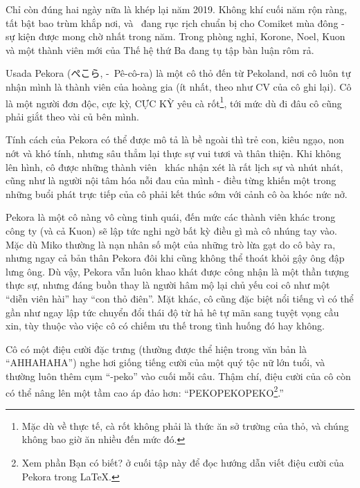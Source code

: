 \documentclass[../main.tex]{subfiles}
\begin{document}

Chỉ còn đúng hai ngày nữa là khép lại năm 2019. Không khí cuối năm rộn ràng, tất bật bao trùm khắp nơi, và \hll\ đang rục rịch chuẩn bị cho Comiket mùa đông - sự kiện được mong chờ nhất trong năm. Trong phòng nghỉ, Korone, Noel, Kuon và một thành viên mới của Thế hệ thứ Ba đang tụ tập bàn luận rôm rả.

\chrint


Usada Pekora (ぺこら, -\ Pê-cô-ra) là một cô thỏ đến từ Pekoland, nơi cô luôn tự nhận mình là thành viên của hoàng gia (ít nhất, theo như CV của cô ghi lại). Cô là một người đơn độc, cực kỳ, CỰC KỲ yêu cà rốt\footnote{Mặc dù về thực tế, cà rốt không phải là thức ăn sở trường của thỏ, và chúng không bao giờ ăn nhiều đến mức đó.}, tới mức dù đi đâu cô cũng phải giắt theo vài củ bên mình.

Tính cách của Pekora có thể được mô tả là bề ngoài thì trẻ con, kiêu ngạo, non nớt và khó tính, nhưng sâu thẳm lại thực sự vui tươi và thân thiện. Khi không lên hình, cô được những thành viên \hll\ khác nhận xét là rất lịch sự và nhút nhát, cũng như là người nội tâm hóa nỗi đau của mình - điều từng khiến một trong những buổi phát trực tiếp của cô phải kết thúc sớm với cảnh cô òa khóc nức nở.

Pekora là một cô nàng vô cùng tinh quái, đến mức các thành viên khác trong công ty (và cả Kuon) sẽ lập tức nghi ngờ bất kỳ điều gì mà cô nhúng tay vào. Mặc dù Miko thường là nạn nhân số một của những trò lừa gạt do cô bày ra, nhưng ngay cả bản thân Pekora đôi khi cũng không thể thoát khỏi gậy ông đập lưng ông. Dù vậy, Pekora vẫn luôn khao khát được công nhận là một thần tượng thực sự, nhưng đáng buồn thay là người hâm mộ lại chủ yếu coi cô như một ``diễn viên hài'' hay ``con thỏ điên''. Mặt khác, cô cũng đặc biệt nổi tiếng vì có thể gần như ngay lập tức chuyển đổi thái độ từ hả hê tự mãn sang tuyệt vọng cầu xin, tùy thuộc vào việc cô có chiếm ưu thế trong tình huống đó hay không.

Cô có một điệu cười đặc trưng (thường được thể hiện trong văn bản là ``AH\downarrow HA\uparrow HA\uparrow HA\uparrow'') nghe hơi giống tiếng cười của một quý tộc nữ lớn tuổi, và thường luôn thêm cụm ``-peko'' vào cuối mỗi câu. Thậm chí, điệu cười của cô còn có thể nâng lên một tầm cao áp đảo hơn: ``PE\arrow[45] KO\arrow[-45] PE\arrow[45] KO\arrow[-45] PE\arrow[45] KO\arrow[-45]\footnote{Xem phần {\abv Bạn có biết?} ở cuối tập này để đọc hướng dẫn viết điệu cười của Pekora trong \LaTeX.}.''
\end{document}
